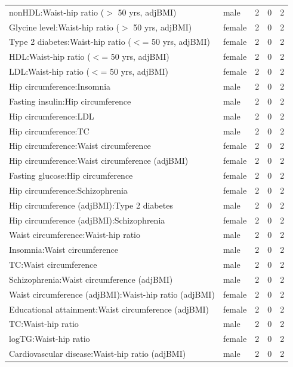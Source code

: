 \begin{table}[ht]
\begin{tabular}{llrrr}
  nonHDL:Waist-hip ratio ($>$ 50 yrs, adjBMI) & male &   2 &   0 &   2 \\ 
  Glycine level:Waist-hip ratio ($>$ 50 yrs, adjBMI) & female &   2 &   0 &   2 \\ 
  Type 2 diabetes:Waist-hip ratio ($<$= 50 yrs, adjBMI) & female &   2 &   0 &   2 \\ 
  HDL:Waist-hip ratio ($<$= 50 yrs, adjBMI) & female &   2 &   0 &   2 \\ 
  LDL:Waist-hip ratio ($<$= 50 yrs, adjBMI) & female &   2 &   0 &   2 \\ 
  Hip circumference:Insomnia & male &   2 &   0 &   2 \\ 
  Fasting insulin:Hip circumference & male &   2 &   0 &   2 \\ 
  Hip circumference:LDL & male &   2 &   0 &   2 \\ 
  Hip circumference:TC & male &   2 &   0 &   2 \\ 
  Hip circumference:Waist circumference & female &   2 &   0 &   2 \\ 
  Hip circumference:Waist circumference (adjBMI) & female &   2 &   0 &   2 \\ 
  Fasting glucose:Hip circumference & female &   2 &   0 &   2 \\ 
  Hip circumference:Schizophrenia & female &   2 &   0 &   2 \\ 
  Hip circumference (adjBMI):Type 2 diabetes & male &   2 &   0 &   2 \\ 
  Hip circumference (adjBMI):Schizophrenia & female &   2 &   0 &   2 \\ 
  Waist circumference:Waist-hip ratio & male &   2 &   0 &   2 \\ 
  Insomnia:Waist circumference & male &   2 &   0 &   2 \\ 
  TC:Waist circumference & male &   2 &   0 &   2 \\ 
  Schizophrenia:Waist circumference (adjBMI) & male &   2 &   0 &   2 \\ 
  Waist circumference (adjBMI):Waist-hip ratio (adjBMI) & female &   2 &   0 &   2 \\ 
  Educational attainment:Waist circumference (adjBMI) & female &   2 &   0 &   2 \\ 
  TC:Waist-hip ratio & male &   2 &   0 &   2 \\ 
  logTG:Waist-hip ratio & female &   2 &   0 &   2 \\ 
  Cardiovascular disease:Waist-hip ratio (adjBMI) & male &   2 &   0 &   2 \\ 

\end{tabular}
\end{table}

